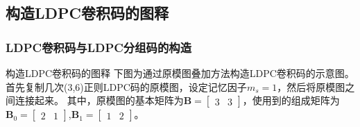 \documentclass{beamer}
\begin{document}
\subsection{构造LDPC卷积码的图释}
\begin{frame}[shrink]
    \frametitle{LDPC卷积码与LDPC分组码的构造}
        \begin{block}{构造LDPC卷积码的图释}
下图为通过原模图叠加方法构造LDPC卷积码的示意图。
首先复制几次(3,6)正则LDPC码的原模图，设定记忆因子$m_s=1$，然后将原模图之间连接起来。
其中，原模图的基本矩阵为$ \mathbf{B} = [\begin{array}{cc} 3&3 \end{array}]$，使用到的组成矩阵为$\mathbf{B}_0 = [\begin{array}{cc} 2&1 \end{array}]$,$\mathbf{B}_1 = [\begin{array}{cc} 1&2 \end{array}]$。


\end{block}
\end{frame}
\end{document}
